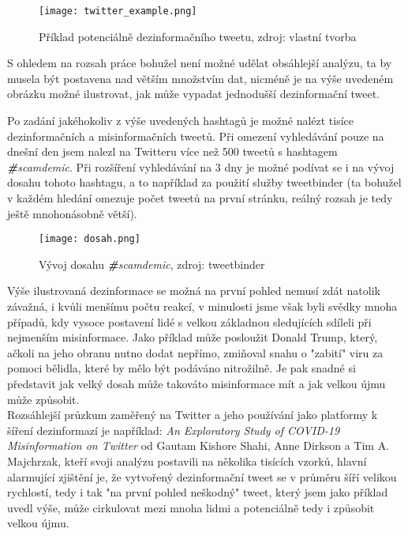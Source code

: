\begin{figure}[htbp]
  \centering
  \texttt{[image: twitter\_example.png]}
  \caption{Příklad potenciálně dezinformačního tweetu, zdroj: vlastní tvorba}
  \label{fig:twitter example}
\end{figure}
\vspace*{-5mm}

\begin{framed}
{\small S ohledem na rozsah práce bohužel není možné udělat obsáhlejší analýzu, ta by musela být postavena nad větším množstvím dat, nicméně je na výše uvedeném obrázku možné ilustrovat, jak může vypadat jednodušší dezinformační tweet.}
\end{framed}

Po zadání jakéhokoliv z výše uvedených hashtagů je možné nalézt tisíce dezinformačních a misinformačních tweetů. Při omezení vyhledávání pouze na dnešní den jsem nalezl na Twitteru více než 500 tweetů s hashtagem \textit{\textbf{\#}scamdemic}. Při rozšíření vyhledávání na 3 dny je možné podívat se i na vývoj dosahu tohoto hashtagu, a to například za použití služby tweetbinder (ta bohužel v každém hledání omezuje počet tweetů na první stránku, reálný rozsah je tedy ještě mnohonásobně větší).\\

\begin{figure}[htbp]
  \centering
  \texttt{[image: dosah.png]}
  \caption{Vývoj dosahu \textit{\textbf{\#}scamdemic}, zdroj: tweetbinder}
  \label{fig:twitter dosah}
\end{figure}

Výše ilustrovaná dezinformace se možná na první pohled nemusí zdát natolik závažná, i kvůli menšímu počtu reakcí, v minulosti jsme však byli svědky mnoha případů, kdy vysoce postavení lidé s velkou základnou sledujících sdíleli při nejmenším misinformace. Jako příklad může posloužit Donald Trump, který, ačkoli na jeho obranu nutno dodat nepřímo, zmiňoval snahu o "zabití" viru za pomoci bělidla, které by mělo být podáváno nitrožilně\cite{noauthor_coronavirus_2020}. Je pak snadné si představit jak velký dosah může takováto misinformace mít a jak velkou újmu může způsobit.\\


Rozsáhlejší průzkum zaměřený na Twitter a jeho používání jako platformy k šíření dezinformazí je například: \textit{An Exploratory Study of COVID-19 Misinformation on Twitter} od Gautam Kishore Shahi, Anne Dirkson a Tim A. Majchrzak, kteří svoji analýzu postavili na několika tisících vzorků\cite{shahi_exploratory_2020}, hlavní alarmující zjištění je, že vytvořený dezinformační tweet se v průměru šíří velikou rychlostí, tedy i tak "na první pohled neškodný" tweet, který jsem jako příklad uvedl výše, může cirkulovat mezi mnoha lidmi a potenciálně tedy i způsobit velkou újmu.\\

